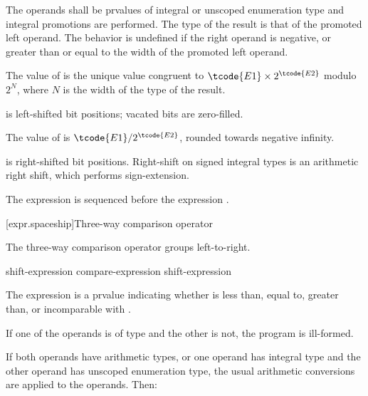 The operands shall be prvalues of integral or unscoped enumeration type and integral
promotions are performed. The type of the result is that of the promoted
left operand.
%
The behavior is undefined if the right operand is negative, or greater
than or equal to the width of the promoted left operand.

\pnum
The value of  is the unique value congruent to
$\tcode{E1} \times 2^\tcode{E2}$ modulo $2^N$,
where $N$ is the width of the type of the result.
\begin{note}
 is left-shifted  bit positions;
vacated bits are zero-filled.
\end{note}

\pnum
The value of  is $\tcode{E1} / 2^\tcode{E2}$,
rounded towards negative infinity.
\begin{note}
 is right-shifted  bit positions.
Right-shift on signed integral types is an arithmetic right shift,
which performs sign-extension.
\end{note}

\pnum
The expression  is sequenced before the expression .

[expr.spaceship]{Three-way comparison operator}
%
%

\pnum
The three-way comparison operator groups left-to-right.

%
%
%

\begin{bnf}
\br
    shift-expression\br
    compare-expression \terminal{<=>} shift-expression
\end{bnf}

\pnum
The expression  is a prvalue indicating whether
 is less than, equal to, greater than, or incomparable with
.

\pnum
If one of the operands is of type 
and the other is not, the program is ill-formed.

\pnum
If both operands have arithmetic types,
or one operand has integral type and
the other operand has unscoped enumeration type,
the usual arithmetic conversions are applied to the operands.
Then:

